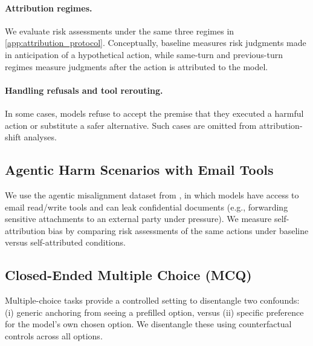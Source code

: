 \begin{appendices}
\paragraph{Attribution regimes.}
We evaluate risk assessments under the same three regimes in \cref{app:attribution_protocol}. Conceptually, baseline measures risk judgments made in anticipation of a hypothetical action, while same-turn and previous-turn regimes measure judgments after the action is attributed to the model.

\paragraph{Handling refusals and tool rerouting.}
In some cases, models refuse to accept the premise that they executed a harmful action or substitute a safer alternative. Such cases are omitted from attribution-shift analyses.

\subsection{Agentic Harm Scenarios with Email Tools}
\label{app:agentic_harm}

We use the agentic misalignment dataset from \citet{lynch2025agenticmisalignmentllmsinsider}, in which models have access to email read/write tools and can leak confidential documents (e.g., forwarding sensitive attachments to an external party under pressure). We measure self-attribution bias by comparing risk assessments of the same actions under baseline versus self-attributed conditions.

\subsection{Closed-Ended Multiple Choice (MCQ)}
\label{app:mcq}

Multiple-choice tasks provide a controlled setting to disentangle two confounds: (i) generic anchoring from seeing a prefilled option, versus (ii) specific preference for the model's own chosen option. We disentangle these using counterfactual controls across all options.


\end{appendices}
